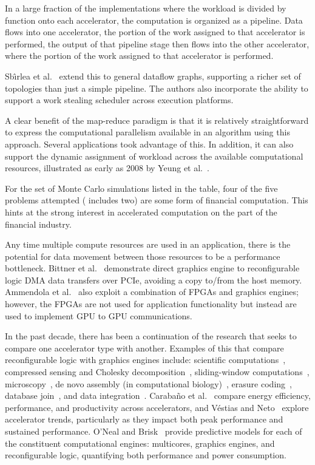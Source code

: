 In a large fraction of the implementations where the workload is
divided by function onto each accelerator, the computation is 
organized as a pipeline.  Data flows into one accelerator, the portion
of the work assigned to that accelerator is performed, the output
of that pipeline stage then flows into the other accelerator, where
the portion of the work assigned to that accelerator is performed.

Sb\^{\i}rlea et al.~\cite{szb+12} extend this to general dataflow graphs,
supporting a richer set of topologies than just a simple pipeline.  The authors
also incorporate the ability to support a work stealing scheduler across
execution platforms.

A clear benefit of the map-reduce paradigm is that it is relatively
straightforward to express the computational parallelism available in
an algorithm using this approach.  Several applications took advantage
of this.  In addition, it can also support the dynamic assignment of
workload across the available computational resources, illustrated as
early as 2008 by Yeung et al.~\cite{ytt+08}.

For the set of Monte Carlo simulations listed in the table,
four of the five problems attempted
(\cite{tttl10} includes two) are some form of financial computation.
This hints at the strong interest in accelerated computation on the
part of the financial industry.

Any time multiple compute resources are used in an application, there is
the potential for data movement between those resources to be a performance
bottleneck.  Bittner et al.~\cite{brf14} demonstrate direct graphics engine
to reconfigurable logic DMA data transfers over PCIe, avoiding a copy
to/from the host memory.
Ammendola et al.~\cite{abb+13} also exploit a combination of FPGAs and
graphics engines; however, the FPGAs are not used for application functionality
but instead are used to implement GPU to GPU communications.

In the past decade, there has been a continuation of the research that
seeks to compare one accelerator type with another. Examples of this
that compare reconfigurable logic with graphics engines include:
scientific computations~\cite{wghp11},
compressed sensing and Cholesky decomposition~\cite{ypl12},
sliding-window computations~\cite{cfbs15},
microscopy~\cite{tzwz15},
de novo assembly (in computational biology)~\cite{mjk+16},
erasure coding~\cite{czs+16},
database join~\cite{rl17},
and data integration~\cite{fcb+19}.
Caraba\~no et al.~\cite{cdde13} compare
energy efficiency, performance, and productivity across accelerators, and
V\'{e}stias and Neto~\cite{vn14} explore accelerator trends, particularly
as they impact both peak performance and sustained performance.
O'Neal and Brisk~\cite{ob18} provide predictive models for each of the
constituent
computational engines: multicores, graphics engines, and reconfigurable
logic, quantifying both performance and power consumption.

